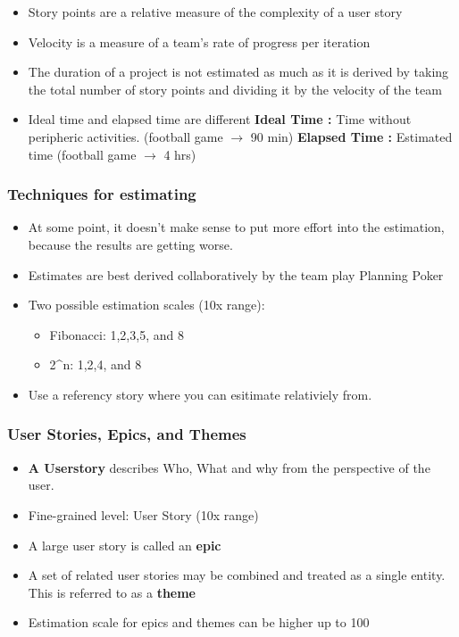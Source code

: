 \begin{itemize}
\tightlist
\item
  Story points are a relative measure of the complexity of a user story
\item
  Velocity is a measure of a team's rate of progress per iteration
\item
  The duration of a project is not estimated as much as it is derived by
  taking the total number of story points and dividing it by the
  velocity of the team
\item
  Ideal time and elapsed time are different
  \subitem \textbf{Ideal Time :} Time without peripheric activities. (football game $\rightarrow$ 90 min)
  \subitem \textbf{Elapsed Time :} Estimated time (football game $\rightarrow$ 4 hrs)
\end{itemize}


\hypertarget{techniques-for-estimating}{%
\subsubsection{Techniques for
estimating}\label{techniques-for-estimating}}

\begin{itemize}
\tightlist
\item
  At some point, it doesn't make sense to put more effort into the
  estimation, because the results are getting worse.
\item
  Estimates are best derived collaboratively by the team play Planning
  Poker
\item
  Two possible estimation scales (10x range):

  \begin{itemize}
  \tightlist
  \item
    Fibonacci: 1,2,3,5, and 8
  \item
    2\^{}n: 1,2,4, and 8
  \end{itemize}
  
  \item Use a referency story where you can esitimate relativiely from.
\end{itemize}

\hypertarget{user-stories-epics-and-themes}{%
\subsubsection{User Stories, Epics, and
Themes}\label{user-stories-epics-and-themes}}

\begin{itemize}
\tightlist
  \item \textbf{A Userstory} describes Who, What and why from the perspective of the user.
\item
  Fine-grained level: User Story (10x range)
\item
  A large user story is called an \textbf{epic}
\item
  A set of related user stories may be combined and treated as a single
  entity. This is referred to as a \textbf{theme}
\item
  Estimation scale for epics and themes can be higher up to 100
\end{itemize}

